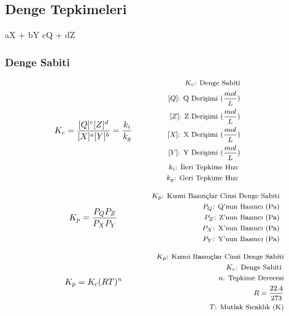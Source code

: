 \subsection{Denge Tepkimeleri}

\begin{chemmath}
    aX + bY
    \reactrarrow{0pt}{1.5cm}{}{}
    cQ + dZ
  \end{chemmath}

\subsubsection*{Denge Sabiti}
\begin{equation}
K_c = \frac{[Q]^c [Z]^d }{[X]^a [Y]^b} = \frac{k_i}{k_g} \qquad \qquad \parbox{4cm}{\footnotesize$\begin{aligned}
    K_c\text{: Denge Sabiti} \\
    [Q]\text{: Q Derişimi (} \frac{mol}{L} \text{)} \\
    [Z]\text{: Z Derişimi (} \frac{mol}{L} \text{)} \\
    [X]\text{: X Derişimi (} \frac{mol}{L} \text{)} \\
    [Y]\text{: Y Derişimi (} \frac{mol}{L} \text{)} \\
    k_i\text{: İleri Tepkime Hızı } \\
    k_g\text{: Geri Tepkime Hızı }
\end{aligned}$}
\end{equation}

\begin{equation}
K_p = \frac{P_Q P_Z }{P_X P_Y} \qquad \qquad \parbox{4cm}{\footnotesize$\begin{aligned}
    K_p\text{: Kısmi Basınçlar Cinsi Denge Sabiti} \\
    P_Q\text{: Q'nun Basıncı} \text{ (Pa)} \\
    P_Z\text{: Z'nun Basıncı} \text{ (Pa)} \\
    P_X\text{: X'nun Basıncı} \text{ (Pa)} \\
    P_Y\text{: Y'nun Basıncı} \text{ (Pa)}
\end{aligned}$}
\end{equation}

\begin{equation}
K_p = K_c (RT)^n \qquad \qquad \parbox{4cm}{\footnotesize$\begin{aligned}
    K_p\text{: Kısmi Basınçlar Cinsi Denge Sabiti} \\
    K_c\text{: Denge Sabiti } \\
    n\text{: Tepkime Derecesi} \\
    R = \frac{22.4}{273} \\
    T\text{: Mutlak Sıcaklık (K)}
\end{aligned}$}
\end{equation}

